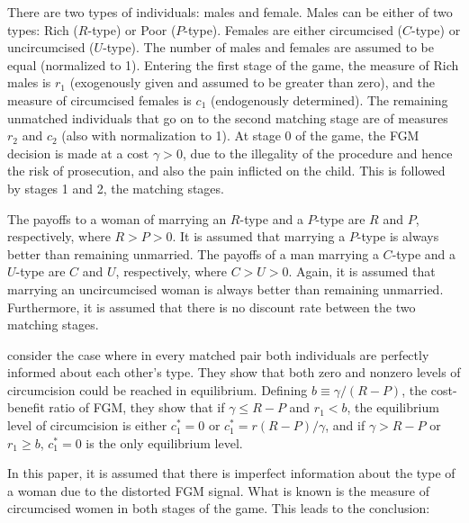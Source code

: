 \documentclass[12pt]{article}
\begin{document}
There are two types of individuals: males and female.  Males can be either of two types: Rich ($R$-type) or Poor ($P$-type).  Females are either circumcised ($C$-type) or uncircumcised ($U$-type). The number of males and females are assumed to be equal (normalized to 1).  Entering the first stage of the game, the measure of Rich males is $r_1$ (exogenously given and assumed to be greater than zero), and the measure of circumcised females is  $c_1$ (endogenously determined). The remaining unmatched individuals that go on to the second matching stage are of measures $r_2$ and $c_2$ (also with normalization to 1). At stage 0 of the game, the FGM decision is made at a cost $\gamma > 0$, due to the illegality of the procedure and hence the risk of prosecution, and also the pain inflicted on the child. This is followed by stages 1 and 2, the matching stages.

The payoffs to a woman of marrying an $R$-type and a $P$-type are $R$ and $P$, respectively, where $R > P > 0$. It is assumed that marrying a $P$-type is always better than remaining unmarried. The payoffs of a man marrying a $C$-type and a $U$-type are $C$ and $U$, respectively, where $C > U > 0$. Again, it is assumed that marrying an uncircumcised woman is always better than remaining unmarried. Furthermore, it is assumed that there is no discount rate between the two matching stages.

\citet{Chesnokova2007} consider the case where in every matched pair both individuals are perfectly informed about each other's type.  They show that both zero and nonzero levels of circumcision could be reached in equilibrium.  Defining $b \equiv \gamma/(R - P)$, the cost-benefit ratio of FGM, they show that if $\gamma \leq R - P$ and $r_1 < b$, the equilibrium level of circumcision is either $c_1^* = 0$ or $c_1^* = r(R-P)/\gamma$, and if $\gamma > R - P$ or $r_1 \geq b$, $c_1^* = 0$ is the only equilibrium level.

In this paper, it is assumed that there is imperfect information about the type of a woman due to the distorted FGM signal.  What is known is the measure of circumcised women in both stages of the game.  This leads to the conclusion:
\end{document}
